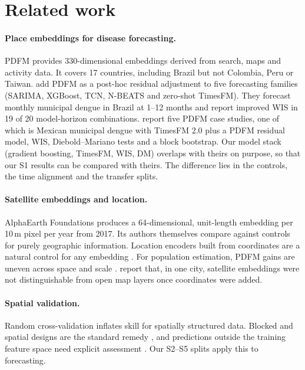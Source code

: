 \documentclass[11pt]{article}
\begin{document}
\section{Related work}
\label{sec:related}

\paragraph{Place embeddings for disease forecasting.}
PDFM \citep{agarwal2024pdfm} provides 330-dimensional embeddings derived from search, maps and
activity data. It covers 17 countries, including Brazil but not Colombia, Peru or Taiwan.
\citet{brittain2026foundation} add PDFM as a post-hoc residual adjustment to five forecasting
families (SARIMA, XGBoost, TCN, N-BEATS and zero-shot TimesFM). They forecast monthly
municipal dengue in Brazil at 1--12 months and report improved WIS in 19 of 20 model-horizon
combinations. \citet{muslim2026planetary} report five PDFM case studies, one of which is
Mexican municipal dengue with TimesFM 2.0 plus a PDFM residual model, WIS, Diebold--Mariano
tests and a block bootstrap. Our model stack (gradient boosting, TimesFM, WIS, DM) overlaps with
theirs on purpose, so that our S1 results can be compared with theirs. The difference lies in the
controls, the time alignment and the transfer splits.

\paragraph{Satellite embeddings and location.}
AlphaEarth Foundations \citep{brown2025alphaearth} produces a 64-dimensional, unit-length embedding
per 10\,m pixel per year from 2017. Its authors themselves compare against controls for purely
geographic information. Location encoders built from coordinates are a natural control for any
embedding \citep{russwurm2024location,klemmer2025satclip}. For
population estimation, PDFM gains are uneven across space and scale \citep{zhang2026population}.
\citet{pradhan2026benchmarks} report that, in one city, satellite embeddings were not
distinguishable from open map layers once coordinates were added.

\paragraph{Spatial validation.}
Random cross-validation inflates skill for spatially structured data. Blocked and spatial designs
are the standard remedy \citep{roberts2017cv,ploton2020spatial}, and predictions outside the
training feature space need explicit assessment \citep{meyer2021aoa,meyer2022global}. Our S2--S5
splits apply this to forecasting.
\end{document}
